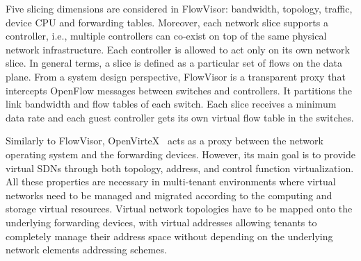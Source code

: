 Five slicing dimensions are considered in FlowVisor: bandwidth, topology, traffic, device CPU and forwarding 
tables. Moreover, each network slice supports a controller, i.e., multiple controllers can co-exist on top 
of the same physical network infrastructure. Each controller is allowed to act only on its own network slice.
In general terms, a slice is defined as a particular set of flows on the data plane. 
From a system design perspective, FlowVisor is a transparent proxy that intercepts OpenFlow messages between 
switches and controllers. It partitions the link bandwidth and flow tables of each switch. Each slice receives 
a minimum data rate and each guest controller gets its own virtual flow table in the switches.

Similarly to FlowVisor, OpenVirteX~\cite{al-shabibi2014,Al_Shabibi2014_4} acts as a proxy between the network operating system and the forwarding 
devices. However, its main goal is to provide virtual SDNs through both topology, address, and control function
virtualization. 
All these properties are necessary in multi-tenant environments where virtual networks 
need to be managed and migrated according to the computing and storage virtual resources. Virtual network 
topologies have to be mapped onto the underlying forwarding devices, with virtual addresses allowing tenants to completely manage their address space without depending on the underlying network elements addressing schemes.


